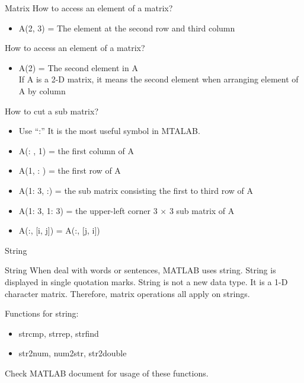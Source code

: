 \begin{frame}{Matrix}
How to access an element of a matrix?
\begin{itemize}
\item A(2, 3) = The element at the second row and third column
\end{itemize}
How to access an element of a matrix?
\begin{itemize}
\item A(2) = The second element in A\\
\* If A is a 2-D matrix, it means the second element when arranging element of A by column
\end{itemize}
How to cut a sub matrix?
\begin{itemize}
\item Use ``:''  It is the most useful symbol in MTALAB.
\item A(: , 1) = the first column of A
\item A(1, : ) = the first row of A
\item A(1: 3, :) = the sub matrix consisting the first to third row of A
\item A(1: 3, 1: 3) = the upper-left corner 3 $\times$ 3 sub matrix of A
\item A(:, [i, j]) = A(:, [j, i])
\end{itemize}
\end{frame}

\begin{frame}{String}
\begin{block}{String}
When deal with words or sentences, MATLAB uses string. String is displayed in single quotation marks. String is not a new data type. It is a 1-D character matrix. Therefore, matrix operations all apply on strings. \footnotemark
\end{block}
Functions for string:
\begin{itemize}
\item strcmp, strrep, strfind
\item str2num, num2str, str2double
\end{itemize}
Check MATLAB document for usage of these functions.
\end{frame}

